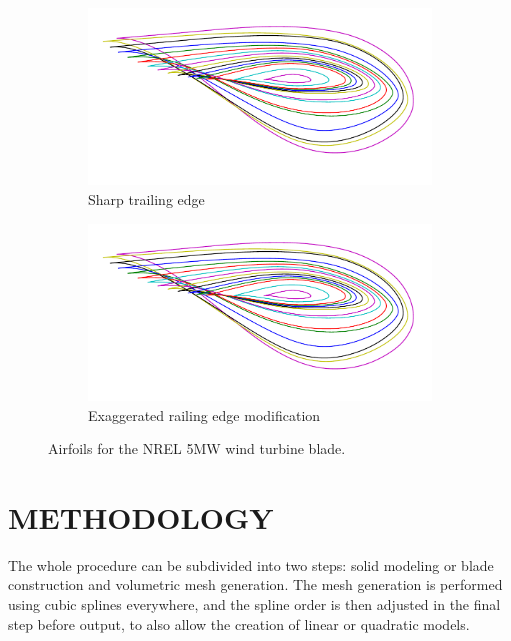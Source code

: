 \documentclass{nordic}
\begin{document}
\begin{figure}
  \centering
  \begin{subfigure}[b]{0.40\textwidth}
    \includegraphics[width=\textwidth]{figs/airfoils-note}
    \caption{Sharp trailing edge}
    \label{fig:airfoils:note}
  \end{subfigure}
  \begin{subfigure}[b]{0.40\textwidth}
    \includegraphics[width=\textwidth]{figs/airfoils-te}
    \caption{Exaggerated railing edge modification}
    \label{fig:airfoils:te}
  \end{subfigure}
  \caption{Airfoils for the NREL 5MW wind turbine blade.}
\end{figure}

\section{METHODOLOGY}

The whole procedure can be subdivided into two steps: solid modeling or blade construction and
volumetric mesh generation.  The mesh generation is performed using cubic splines everywhere, and the
spline order is then adjusted in the final step before output, to also allow the creation of linear
or quadratic models.
\end{document}
